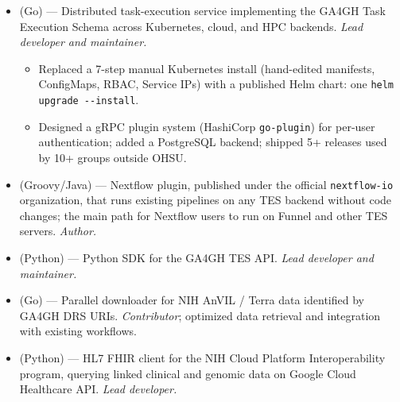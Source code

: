 \begin{itemize}
    \item \textbf{} (Go) --- Distributed task-execution service implementing the GA4GH Task Execution Schema across Kubernetes, cloud, and HPC backends. \emph{Lead developer and maintainer.}
    \begin{itemize}
        \item Replaced a 7-step manual Kubernetes install (hand-edited manifests, ConfigMaps, RBAC, Service IPs) with a published Helm chart: one \texttt{helm upgrade -{}-install}.
        \item Designed a gRPC plugin system (HashiCorp \texttt{go-plugin}) for per-user authentication; added a PostgreSQL backend; shipped 5+ releases used by 10+ groups outside OHSU.
    \end{itemize}

    \item \textbf{} (Groovy/Java) --- Nextflow plugin, published under the official \texttt{nextflow-io} organization, that runs existing pipelines on any TES backend without code changes; the main path for Nextflow users to run on Funnel and other TES servers. \emph{Author.}

    \item \textbf{} (Python) --- Python SDK for the GA4GH TES API. \emph{Lead developer and maintainer.}

    \item \textbf{} (Go) --- Parallel downloader for NIH AnVIL / Terra data identified by GA4GH DRS URIs. \emph{Contributor}; optimized data retrieval and integration with existing workflows.

    \item \textbf{} (Python) --- HL7 FHIR client for the NIH Cloud Platform Interoperability program, querying linked clinical and genomic data on Google Cloud Healthcare API. \emph{Lead developer.}
\end{itemize}
